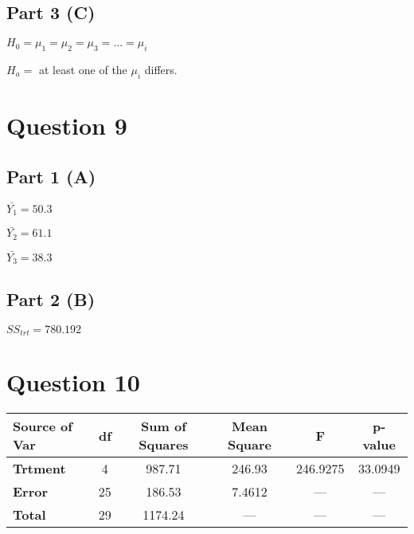 \documentclass[]{article}
\begin{document}
\hypertarget{part-3-c}{%
\subsection{Part 3 (C)}\label{part-3-c}}

\(H_0=\mu_1=\mu_2=\mu_3=...=\mu_i\)

\(H_a=\) at least one of the \(\mu_i\) differs.

\hypertarget{question-9}{%
\section{Question 9}\label{question-9}}

\hypertarget{part-1-a-2}{%
\subsection{Part 1 (A)}\label{part-1-a-2}}

\(\bar{Y_1}=50.3\)

\(\bar{Y_2}=61.1\)

\(\bar{Y_3}=38.3\)

\hypertarget{part-2-b-2}{%
\subsection{Part 2 (B)}\label{part-2-b-2}}

\(SS_{trt}=780.192\)

\hypertarget{question-10}{%
\section{Question 10}\label{question-10}}

\small
\begin{center}
\begin{tabular}{l | c c c c c}
\textbf{Source of Var} & \hspace{10pt} \textbf{df} \hspace{10pt}
& \textbf{Sum of Squares} & \textbf{Mean Square} & \textbf{F} & \textbf{p-value} \\
\hline
\textbf{Trtment} & 4 & 987.71 & 246.93 & 246.9275 & 33.0949 \\
\textbf{Error} & 25 & 186.53 & 7.4612 & --- & --- \\
\hline
\textbf{Total} & 29 & 1174.24 & --- & --- & --- \\
\end{tabular}
\end{center}
\end{document}
